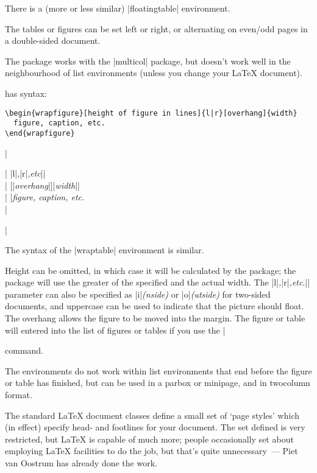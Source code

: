 \begin{description}
  There is a (more or less similar) |floatingtable| environment.

  The tables or figures can be set left or right, or alternating on
  even/odd pages in a double-sided document.

  The package works with the |multicol| package, but doesn't work well
  in the neighbourhood of list environments (unless you change your
  \LaTeX{} document).
\item[\texttt{wrapfig}]  has syntax:

\begin{htmlversion}
\begin{verbatim}
\begin{wrapfigure}[height of figure in lines]{l|r}[overhang]{width}
  figure, caption, etc.
\end{wrapfigure}
\end{verbatim}
\end{htmlversion}
  \htmlignore
  |\begin{wrapfigure}|%
    |{l|,|r|,\emph{etc}|}|\\
  |                  [|\emph{overhang}|]{|\emph{width}|}|\\
  |   |\emph{figure, caption, etc.}\\
  |\end{wrapfigure}|
  \endhtmlignore

  The syntax of the |wraptable| environment is similar.

  Height can be omitted, in which case it will be calculated by the
  package; the package will use the greater of the specified and the
  actual width.  The |{l|\emph{,}|r|\emph{,etc}.|}| parameter can also be
  specified as |i|\emph{(nside)} or |o|\emph{(utside)} for two-sided
  documents, and uppercase can be used to indicate that the picture
  should float.  The overhang allows the figure to be moved into the
  margin.  The figure or table will entered into the list of figures
  or tables if you use the |\caption| command.

  The environments do not work within list environments that end
  before the figure or table has finished, but can be used in a parbox
  or minipage, and in twocolumn format.
\end{description}

{}

The standard \LaTeX{} document classes define a small set of `page
styles' which (in effect) specify head- and footlines for your
document.  The set defined is very restricted, but \LaTeX{} is capable
of much more; people occasionally set about employing \LaTeX{}
facilities to do the job, but that's quite unnecessary~--- Piet van
Oostrum has already done the work.

